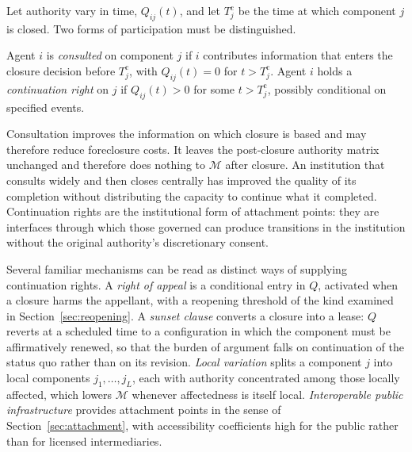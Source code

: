 Let authority vary in time, $Q_{ij}(t)$, and let $T^{\mathrm{c}}_j$ be the time at which component $j$ is closed. Two forms of participation must be distinguished.

\begin{definition}
Agent $i$ is \emph{consulted} on component $j$ if $i$ contributes information that enters the closure decision before $T^{\mathrm{c}}_j$, with $Q_{ij}(t)=0$ for $t>T^{\mathrm{c}}_j$. Agent $i$ holds a \emph{continuation right} on $j$ if $Q_{ij}(t)>0$ for some $t>T^{\mathrm{c}}_j$, possibly conditional on specified events.
\end{definition}

Consultation improves the information on which closure is based and may therefore reduce foreclosure costs. It leaves the post-closure authority matrix unchanged and therefore does nothing to $\mathcal{M}$ after closure. An institution that consults widely and then closes centrally has improved the quality of its completion without distributing the capacity to continue what it completed. Continuation rights are the institutional form of attachment points: they are interfaces through which those governed can produce transitions in the institution without the original authority's discretionary consent.

Several familiar mechanisms can be read as distinct ways of supplying continuation rights. A \emph{right of appeal} is a conditional entry in $Q$, activated when a closure harms the appellant, with a reopening threshold of the kind examined in Section~\ref{sec:reopening}. A \emph{sunset clause} converts a closure into a lease: $Q$ reverts at a scheduled time to a configuration in which the component must be affirmatively renewed, so that the burden of argument falls on continuation of the status quo rather than on its revision. \emph{Local variation} splits a component $j$ into local components $j_1,\dots,j_L$, each with authority concentrated among those locally affected, which lowers $\mathcal{M}$ whenever affectedness is itself local. \emph{Interoperable public infrastructure} provides attachment points in the sense of Section~\ref{sec:attachment}, with accessibility coefficients high for the public rather than for licensed intermediaries.


